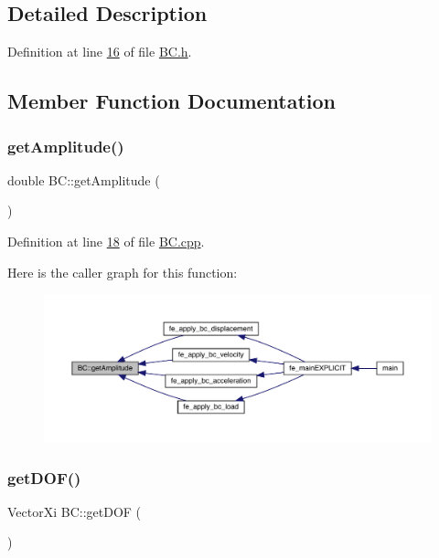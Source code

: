 \subsection{Detailed Description}


Definition at line \hyperlink{_b_c_8h_source_l00016}{16} of file \hyperlink{_b_c_8h_source}{B\+C.\+h}.



\subsection{Member Function Documentation}
\mbox{\label{class_b_c_ad648545e6ee046075350cd9b3c88e610}} 
\subsubsection{\texorpdfstring{get\+Amplitude()}{getAmplitude()}}
{\footnotesize\ttfamily double B\+C\+::get\+Amplitude (\begin{DoxyParamCaption}{ }\end{DoxyParamCaption})}



Definition at line \hyperlink{_b_c_8cpp_source_l00018}{18} of file \hyperlink{_b_c_8cpp_source}{B\+C.\+cpp}.

Here is the caller graph for this function\+:\nopagebreak
\begin{figure}[H]
\begin{center}
\leavevmode
\includegraphics[width=350pt]{class_b_c_ad648545e6ee046075350cd9b3c88e610_icgraph}
\end{center}
\end{figure}
\mbox{\label{class_b_c_a0bc8eb90956a082ada5e4daa5e32c9fc}} 
\subsubsection{\texorpdfstring{get\+D\+O\+F()}{getDOF()}}
{\footnotesize\ttfamily Vector\+Xi B\+C\+::get\+D\+OF (\begin{DoxyParamCaption}{ }\end{DoxyParamCaption})}



